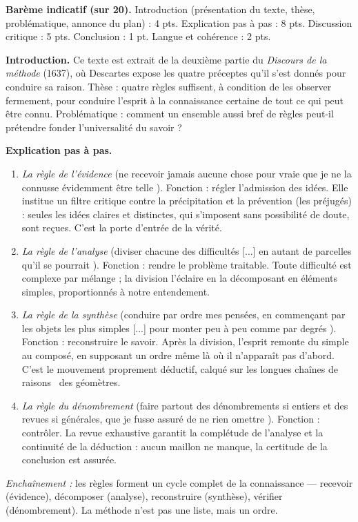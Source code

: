 \documentclass[11pt]{article}
\newcommand{\cle}[1]{{\popxbold\color{popdark}#1}}
\begin{document}
\begin{corrige}
\textbf{Barème indicatif (sur 20).} Introduction (présentation du texte, thèse, problématique, annonce du plan) : 4 pts. Explication pas à pas : 8 pts. Discussion critique : 5 pts. Conclusion : 1 pt. Langue et cohérence : 2 pts.

\textbf{Introduction.} Ce texte est extrait de la deuxième partie du \emph{Discours de la méthode} (1637), où Descartes expose les quatre préceptes qu'il s'est donnés pour conduire sa raison. \cle{Thèse} : quatre règles suffisent, à condition de les observer fermement, pour conduire l'esprit à la connaissance certaine de tout ce qui peut être connu. \cle{Problématique} : comment un ensemble aussi bref de règles peut-il prétendre fonder l'universalité du savoir ?

\textbf{Explication pas à pas.}
\begin{enumerate}
\item \emph{La règle de l'\cle{évidence}} (\guillemotleft ne recevoir jamais aucune chose pour vraie que je ne la connusse évidemment être telle \guillemotright). \cle{Fonction} : régler l'admission des idées. Elle institue un \cle{filtre critique} contre la précipitation et la \cle{prévention} (les préjugés) : seules les idées \cle{claires et distinctes}, qui s'imposent sans possibilité de doute, sont reçues. C'est la \cle{porte d'entrée} de la vérité.
\item \emph{La règle de l'\cle{analyse}} (\guillemotleft diviser chacune des difficultés [...] en autant de parcelles qu'il se pourrait \guillemotright). \cle{Fonction} : rendre le problème traitable. Toute difficulté est \cle{complexe par mélange} ; la division l'éclaire en la décomposant en éléments simples, proportionnés à notre entendement.
\item \emph{La règle de la \cle{synthèse}} (\guillemotleft conduire par ordre mes pensées, en commençant par les objets les plus simples [...] pour monter peu à peu comme par degrés \guillemotright). \cle{Fonction} : reconstruire le savoir. Après la division, l'esprit remonte du simple au composé, en supposant un \cle{ordre} même là où il n'apparaît pas d'abord. C'est le mouvement proprement \cle{déductif}, calqué sur les \guillemotleft longues chaînes de raisons \guillemotright\ des géomètres.
\item \emph{La règle du \cle{dénombrement}} (\guillemotleft faire partout des dénombrements si entiers et des revues si générales, que je fusse assuré de ne rien omettre \guillemotright). \cle{Fonction} : contrôler. La \cle{revue exhaustive} garantit la complétude de l'analyse et la continuité de la déduction : aucun maillon ne manque, la certitude de la conclusion est assurée.
\end{enumerate}
\emph{Enchaînement :} les règles forment un \cle{cycle complet} de la connaissance — recevoir (évidence), décomposer (analyse), reconstruire (synthèse), vérifier (dénombrement). La méthode n'est pas une liste, mais un \cle{ordre}.


\end{corrige}
\end{document}
